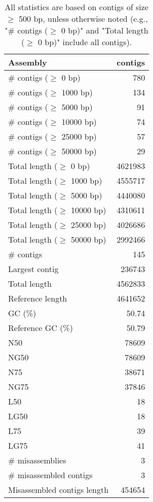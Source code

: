 \documentclass[12pt,a4paper]{article}
\begin{document}
\begin{table}[ht]
\begin{center}
\caption{All statistics are based on contigs of size $\geq$ 500 bp, unless otherwise noted (e.g., "\# contigs ($\geq$ 0 bp)" and "Total length ($\geq$ 0 bp)" include all contigs).}
\begin{tabular}{|l*{1}{|r}|}
\hline
Assembly & contigs \\ \hline
\# contigs ($\geq$ 0 bp) & 780 \\ \hline
\# contigs ($\geq$ 1000 bp) & 134 \\ \hline
\# contigs ($\geq$ 5000 bp) & 91 \\ \hline
\# contigs ($\geq$ 10000 bp) & 74 \\ \hline
\# contigs ($\geq$ 25000 bp) & 57 \\ \hline
\# contigs ($\geq$ 50000 bp) & 29 \\ \hline
Total length ($\geq$ 0 bp) & 4621983 \\ \hline
Total length ($\geq$ 1000 bp) & 4555717 \\ \hline
Total length ($\geq$ 5000 bp) & 4440080 \\ \hline
Total length ($\geq$ 10000 bp) & 4310611 \\ \hline
Total length ($\geq$ 25000 bp) & 4026686 \\ \hline
Total length ($\geq$ 50000 bp) & 2992466 \\ \hline
\# contigs & 145 \\ \hline
Largest contig & 236743 \\ \hline
Total length & 4562833 \\ \hline
Reference length & 4641652 \\ \hline
GC (\%) & 50.74 \\ \hline
Reference GC (\%) & 50.79 \\ \hline
N50 & 78609 \\ \hline
NG50 & 78609 \\ \hline
N75 & 38671 \\ \hline
NG75 & 37846 \\ \hline
L50 & 18 \\ \hline
LG50 & 18 \\ \hline
L75 & 39 \\ \hline
LG75 & 41 \\ \hline
\# misassemblies & 3 \\ \hline
\# misassembled contigs & 3 \\ \hline
Misassembled contigs length & 454654 \\ \hline

\end{tabular}
\end{center}
\end{table}
\end{document}
